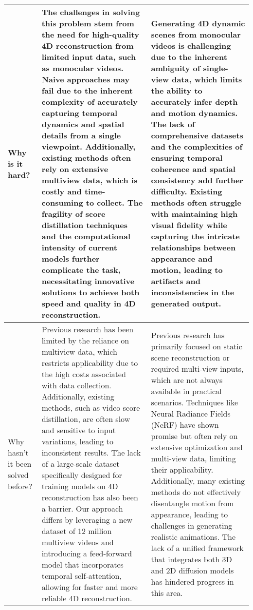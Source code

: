 \begin{table*}[htbp]
\begin{tabular}{p{3cm}p{6cm}p{6cm}}
Why is it hard? & 
The challenges in solving this problem stem from the need for high-quality 4D reconstruction from limited input data, such as monocular videos. Naive approaches may fail due to the inherent complexity of accurately capturing temporal dynamics and spatial details from a single viewpoint. Additionally, existing methods often rely on extensive multiview data, which is costly and time-consuming to collect. The fragility of score distillation techniques and the computational intensity of current models further complicate the task, necessitating innovative solutions to achieve both speed and quality in 4D reconstruction. &
Generating 4D dynamic scenes from monocular videos is challenging due to the inherent ambiguity of single-view data, which limits the ability to accurately infer depth and motion dynamics. The lack of comprehensive datasets and the complexities of ensuring temporal coherence and spatial consistency add further difficulty. Existing methods often struggle with maintaining high visual fidelity while capturing the intricate relationships between appearance and motion, leading to artifacts and inconsistencies in the generated output.
\\ \midrule

Why hasn't it been solved before? & 
Previous research has been limited by the reliance on multiview data, which restricts applicability due to the high costs associated with data collection. Additionally, existing methods, such as video score distillation, are often slow and sensitive to input variations, leading to inconsistent results. The lack of a large-scale dataset specifically designed for training models on 4D reconstruction has also been a barrier. Our approach differs by leveraging a new dataset of 12 million multiview videos and introducing a feed-forward model that incorporates temporal self-attention, allowing for faster and more reliable 4D reconstruction. &
Previous research has primarily focused on static scene reconstruction or required multi-view inputs, which are not always available in practical scenarios. Techniques like Neural Radiance Fields (NeRF) have shown promise but often rely on extensive optimization and multi-view data, limiting their applicability. Additionally, many existing methods do not effectively disentangle motion from appearance, leading to challenges in generating realistic animations. The lack of a unified framework that integrates both 3D and 2D diffusion models has hindered progress in this area.
\\ \midrule


\end{tabular}
\end{table*}
